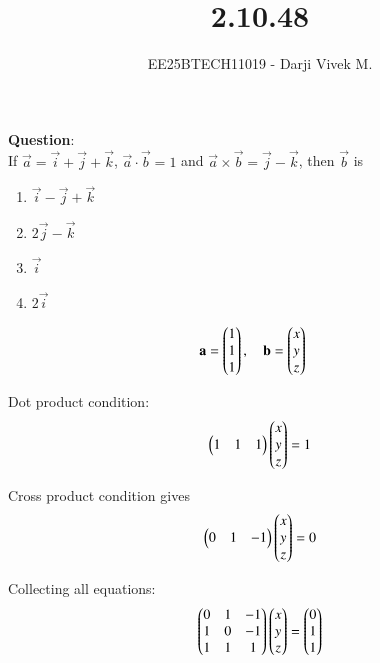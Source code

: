 \documentclass[journal]{IEEEtran}
\begin{document}


\title{2.10.48}
\author{EE25BTECH11019 - Darji Vivek M.}
{\let\newpage\relax\maketitle}

\renewcommand{\thefigure}{\theenumi}
\renewcommand{\thetable}{\theenumi}
\setlength{\intextsep}{10pt}
\renewcommand{\thetable}{\theenumi}

\textbf{Question}:\\
If $\vec{a} = \vec{i}+\vec{j}+\vec{k}$, $\vec{a}\cdot\vec{b}=1$ and $\vec{a}\times\vec{b}=\vec{j}-\vec{k}$, then $\vec{b}$ is  

\begin{multicols}{2}
\begin{enumerate}[label=(\alph*)]
\item $\vec{i}-\vec{j}+\vec{k}$  
\item $2\vec{j}-\vec{k}$  
\item $\vec{i}$  
\item $2\vec{i}$  
\end{enumerate}
\end{multicols}  

\solution  

\begin{align}
\mathbf{a} &= \begin{pmatrix}1\\1\\1\end{pmatrix}, \quad 
\mathbf{b} = \begin{pmatrix}x\\y\\z\end{pmatrix}
\end{align}

Dot product condition:
\begin{align}
\begin{pmatrix}1 & 1 & 1\end{pmatrix}\begin{pmatrix}x\\y\\z\end{pmatrix}=1
\end{align}

Cross product condition gives
\begin{align}
\begin{pmatrix}0 & 1 & -1\end{pmatrix}\begin{pmatrix}x\\y\\z\end{pmatrix}=0
\end{align}

Collecting all equations:
\begin{align}
\begin{pmatrix}0 & 1 & -1\\ 1 & 0 & -1\\ 1 & 1 & 1\end{pmatrix}\begin{pmatrix}x\\y\\z\end{pmatrix}=\begin{pmatrix}0\\1\\1\end{pmatrix}
\end{align}
\end{document}

